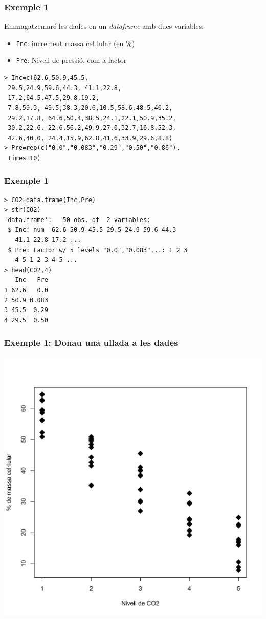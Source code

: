 \documentclass[12pt,t]{beamer}
\theoremstyle{plain}
\theoremstyle{definition}
\begin{document}
\begin{frame}[fragile]
\frametitle{Exemple 1}
Emmagatzemaré les dades  en  un \textsl{dataframe} amb dues variables:
\begin{itemize}
\item \texttt{Inc}: increment massa ce\l.lular (en \%)
\item \texttt{Pre}: Nivell de pressió, com a factor
\end{itemize}
{\small \begin{verbatim}
> Inc=c(62.6,50.9,45.5,
 29.5,24.9,59.6,44.3, 41.1,22.8,
 17.2,64.5,47.5,29.8,19.2,
 7.8,59.3, 49.5,38.3,20.6,10.5,58.6,48.5,40.2,
 29.2,17.8, 64.6,50.4,38.5,24.1,22.1,50.9,35.2,
 30.2,22.6, 22.6,56.2,49.9,27.0,32.7,16.8,52.3,
 42.6,40.0, 24.4,15.9,62.8,41.6,33.9,29.6,8.8)
> Pre=rep(c("0.0","0.083","0.29","0.50","0.86"),
 times=10)
\end{verbatim}
}
\end{frame}

\begin{frame}[fragile]
\frametitle{Exemple 1}

{\small \begin{verbatim}
> CO2=data.frame(Inc,Pre)
> str(CO2)
'data.frame':	50 obs. of  2 variables:
 $ Inc: num  62.6 50.9 45.5 29.5 24.9 59.6 44.3 
   41.1 22.8 17.2 ...
 $ Pre: Factor w/ 5 levels "0.0","0.083",..: 1 2 3 
   4 5 1 2 3 4 5 ...
> head(CO2,4)
   Inc   Pre
1 62.6   0.0
2 50.9 0.083
3 45.5  0.29
4 29.5  0.50
\end{verbatim}
}

\end{frame}


\begin{frame}
\frametitle{Exemple 1: Donau una ullada a les dades}
\vspace*{-5ex}

\begin{center}
\includegraphics[width=0.8\linewidth]{nivellCO2b.pdf}
\end{center}
\end{frame}
\end{document}
